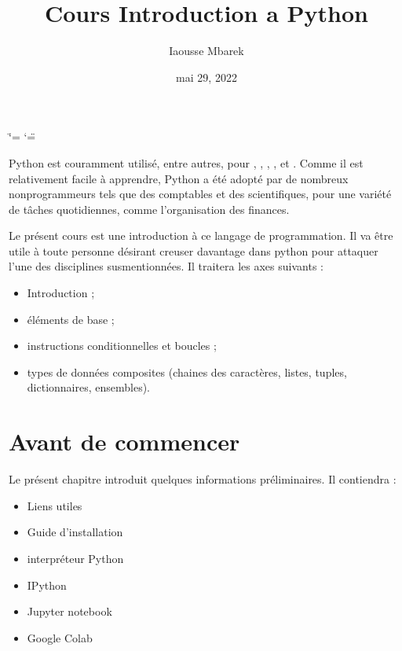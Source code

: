 \documentclass[letterpaper,10pt,french]{sphinxmanual}
\title{Cours Introduction a Python}
\date{mai 29, 2022}
\author{Iaousse M\textquotesingle{}barek}
\begin{document}
\ifdefined\shorthandoff
  \ifnum\catcode`\=\string=\active\shorthandoff{=}\fi
  \ifnum\catcode`\"=\active{}\fi
\fi

\pagestyle{empty}
\sphinxmaketitle
\pagestyle{plain}
\sphinxtableofcontents
\pagestyle{normal}
\label{\detokenize{intro::doc}}


\sphinxAtStartPar
Python est couramment utilisé, entre autres, pour , , , ,  et . Comme il est relativement facile à apprendre, Python a été adopté par de nombreux non\sphinxhyphen{}programmeurs tels que des comptables et des scientifiques, pour une variété de tâches quotidiennes, comme l’organisation des finances.

\sphinxAtStartPar
Le présent cours est une introduction à ce langage de programmation. Il va être utile à toute personne désirant creuser davantage dans python pour attaquer l’une des disciplines susmentionnées. Il traitera les axes suivants :
\begin{itemize}
\item {} 
\sphinxAtStartPar
Introduction ;

\item {} 
\sphinxAtStartPar
éléments de base ;

\item {} 
\sphinxAtStartPar
instructions conditionnelles et boucles ;

\item {} 
\sphinxAtStartPar
types de données composites (chaines des caractères, listes, tuples, dictionnaires, ensembles).

\end{itemize}


\chapter{Avant de commencer}
\label{\detokenize{content0:avant-de-commencer}}\label{\detokenize{content0::doc}}
\sphinxAtStartPar
Le présent chapitre introduit quelques informations préliminaires. Il contiendra :
\begin{itemize}
\item {} 
\sphinxAtStartPar
Liens utiles

\item {} 
\sphinxAtStartPar
Guide d’installation

\item {} 
\sphinxAtStartPar
interpréteur Python

\item {} 
\sphinxAtStartPar
IPython

\item {} 
\sphinxAtStartPar
Jupyter notebook

\item {} 
\sphinxAtStartPar
Google Colab

\end{itemize}
\end{document}
